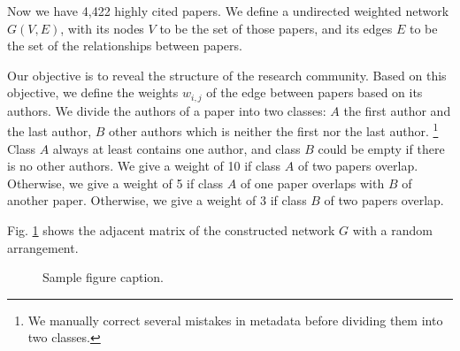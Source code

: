 Now we have 4,422 highly cited papers.
We define a undirected weighted network $G(V,E)$, with its nodes $V$ to be the set of those papers, and its edges $E$ to be the set of the relationships between papers.

Our objective is to reveal the structure of the research community.
Based on this objective, we define the weights $w_{i,j}$ of the edge between papers based on its authors.
We divide the authors of a paper into two classes: $A$ the first author and the last author, $B$ other authors which is neither the first nor the last author.
\footnote{We manually correct several mistakes in metadata before dividing them into two classes.}
Class $A$ always at least contains one author, and class $B$ could be empty if there is no other authors.
We give a weight of 10 if class $A$ of two papers overlap.
Otherwise, we give a weight of 5 if class $A$ of one paper overlaps with $B$ of another paper.
Otherwise, we give a weight of 3 if class $B$ of two papers overlap.

Fig. \ref{fig:matrix_random_arrangement} shows the adjacent matrix of the constructed network $G$ with a random arrangement.

\begin{figure}
    \centering
    \fbox{\rule[-.5cm]{4cm}{4cm} \rule[-.5cm]{4cm}{0cm}}
    \caption{Sample figure caption.}
    \label{fig:matrix_random_arrangement}
\end{figure}
